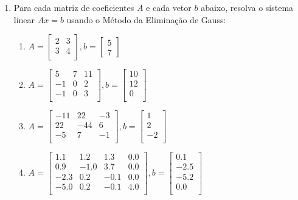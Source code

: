 \documentclass[a4paper]{article}
\begin{document}
\begin{enumerate}
\item Para cada matriz de coeficientes $A$ e cada vetor $b$ abaixo,
  resolva o sistema linear $Ax=b$ usando o Método da Eliminação de
  Gauss:
  \begin{enumerate}
  \item %
    $A = \begin{bmatrix}
        2 & 3\\
        3 & 4\\
      \end{bmatrix},
      b= \begin{bmatrix}
        5\\
        7
      \end{bmatrix}$

  \item %
    $A = \begin{bmatrix}
      5 & 7 & 11\\
      -1 & 0 & 2\\
      -1 & 0 & 3\\
      \end{bmatrix},
      b= \begin{bmatrix}
        10\\
        12\\
        0\\
      \end{bmatrix}$

  \item %
    $A = \begin{bmatrix}
      -11 & 22 & -3\\
      22 & -44 & 6\\
      -5 & 7 & -1\\
      \end{bmatrix},
      b= \begin{bmatrix}
        1\\
        2\\
        -2\\
      \end{bmatrix}$

  \item %
    $A = \begin{bmatrix}
      1.1 & 1.2 & 1.3 & 0.0\\
      0.9 & -1.0 & 3.7 & 0.0\\
      -2.3 & 0.2 & -0.1 & 0.0\\
      -5.0 & 0.2 & -0.1 & 4.0\\
      \end{bmatrix},
      b= \begin{bmatrix}
        0.1\\
        -2.5\\
        -5.2\\
        0.0\\
      \end{bmatrix}$


\end{enumerate}
\end{enumerate}
\end{document}
